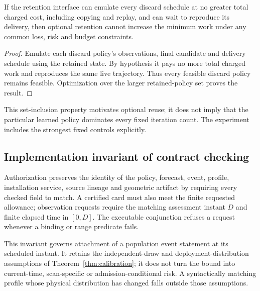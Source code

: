 \begin{proposition}\label{prop:reuse}
If the retention interface can emulate every discard schedule at no greater total charged cost, including copying and replay, and can wait to reproduce its delivery, then optional retention cannot increase the minimum work under any common loss, risk and budget constraints.
\end{proposition}
\begin{proof}
Emulate each discard policy's observations, final candidate and delivery schedule using the retained state. By hypothesis it pays no more total charged work and reproduces the same live trajectory. Thus every feasible discard policy remains feasible. Optimization over the larger retained-policy set proves the result.
\end{proof}
This set-inclusion property motivates optional reuse; it does not imply that the particular learned policy dominates every fixed iteration count. The experiment includes the strongest fixed controls explicitly.

\subsection{Implementation invariant of contract checking}
Authorization preserves the identity of the policy, forecast, event, profile, installation service, source lineage and geometric artifact by requiring every checked field to match. A certified card must also meet the finite requested allowance; observation requests require the matching assessment instant $D$ and finite elapsed time in $[0,D]$. The executable conjunction refuses a request whenever a binding or range predicate fails.

This invariant governs attachment of a population event statement at its scheduled instant. It retains the independent-draw and deployment-distribution assumptions of Theorem~\ref{thm:calibration}; it does not turn the bound into current-time, scan-specific or admission-conditional risk. A syntactically matching profile whose physical distribution has changed falls outside those assumptions.
